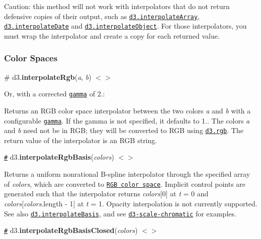 Caution\+: this method will not work with interpolators that do not return defensive copies of their output, such as \href{#interpolateArray}{\tt d3.\+interpolate\+Array}, \href{#interpolateDate}{\tt d3.\+interpolate\+Date} and \href{#interpolateObject}{\tt d3.\+interpolate\+Object}. For those interpolators, you must wrap the interpolator and create a copy for each returned value.

\subsubsection*{Color Spaces}

\label{_interpolateRgb}%
\# d3.{\bfseries interpolate\+Rgb}({\itshape a}, {\itshape b}) \href{https://github.com/d3/d3-interpolate/blob/master/src/rgb.js}{\tt $<$$>$}



Or, with a corrected \href{#interpolate_gamma}{\tt gamma} of 2.\+:



Returns an R\+GB color space interpolator between the two colors {\itshape a} and {\itshape b} with a configurable \href{#interpolate_gamma}{\tt gamma}. If the gamma is not specified, it defaults to 1.. The colors {\itshape a} and {\itshape b} need not be in R\+GB; they will be converted to R\+GB using \href{https://github.com/d3/d3-color#rgb}{\tt d3.\+rgb}. The return value of the interpolator is an R\+GB string.

\href{#interpolateRgbBasis}{\tt \#} d3.{\bfseries interpolate\+Rgb\+Basis}({\itshape colors}) \href{https://github.com/d3/d3-interpolate/blob/master/src/rgb.js#L54}{\tt $<$$>$}

Returns a uniform nonrational B-\/spline interpolator through the specified array of {\itshape colors}, which are converted to \href{https://github.com/d3/d3-color#rgb}{\tt R\+GB color space}. Implicit control points are generated such that the interpolator returns {\itshape colors}\mbox{[}0\mbox{]} at {\itshape t} = 0 and {\itshape colors}\mbox{[}{\itshape colors}.length -\/ 1\mbox{]} at {\itshape t} = 1. Opacity interpolation is not currently supported. See also \href{#interpolateBasis}{\tt d3.\+interpolate\+Basis}, and see \href{https://github.com/d3/d3-scale-chromatic}{\tt d3-\/scale-\/chromatic} for examples.

\href{#interpolateRgbBasisClosed}{\tt \#} d3.{\bfseries interpolate\+Rgb\+Basis\+Closed}({\itshape colors}) \href{https://github.com/d3/d3-interpolate/blob/master/src/rgb.js#L55}{\tt $<$$>$}

